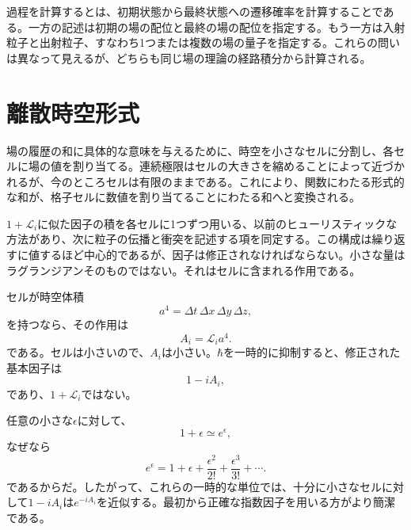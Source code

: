 過程を計算するとは、初期状態から最終状態への遷移確率を計算することである。一方の記述は初期の場の配位と最終の場の配位を指定する。もう一方は入射粒子と出射粒子、すなわち1つまたは複数の場の量子を指定する。これらの問いは異なって見えるが、どちらも同じ場の理論の経路積分から計算される。

\section{離散時空形式}

場の履歴の和に具体的な意味を与えるために、時空を小さなセルに分割し、各セルに場の値を割り当てる。連続極限はセルの大きさを縮めることによって近づかれるが、今のところセルは有限のままである。これにより、関数にわたる形式的な和が、格子セルに数値を割り当てることにわたる和へと変換される。

\(1+\mathcal{L}_i\)に似た因子の積を各セルに1つずつ用いる、以前のヒューリスティックな方法があり、次に粒子の伝播と衝突を記述する項を同定する。この構成は繰り返すに値するほど中心的であるが、因子は修正されなければならない。小さな量はラグランジアンそのものではない。それはセルに含まれる作用である。

セルが時空体積
\begin{equation}
a^4=\Delta t\,\Delta x\,\Delta y\,\Delta z,
\end{equation}
を持つなら、その作用は
\begin{equation}
A_i=\mathcal{L}_i a^4.
\end{equation}
である。セルは小さいので、\(A_i\)は小さい。\(\hbar\)を一時的に抑制すると、修正された基本因子は
\begin{equation}
1-iA_i,
\end{equation}
であり、\(1+\mathcal{L}_i\)ではない。

任意の小さな\(\epsilon\)に対して、
\begin{equation}
1+\epsilon\simeq e^\epsilon,
\end{equation}
なぜなら
\begin{equation}
e^\epsilon
=1+\epsilon+\frac{\epsilon^2}{2!}
+\frac{\epsilon^3}{3!}+\cdots.
\end{equation}
であるからだ。したがって、これらの一時的な単位では、十分に小さなセルに対して\(1-iA_i\)は\(e^{-iA_i}\)を近似する。最初から正確な指数因子を用いる方がより簡潔である。

\begin{classroomqa}
\end{classroomqa}

